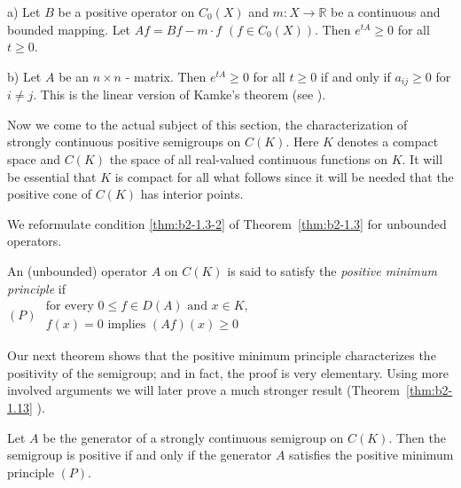 \begin{example}\label{ex:b2-1.4}
a) Let $B$ be a positive operator on $C_{0}(X)$ and $m \colon X \to \mathbb{R}$ be a continuous and bounded mapping.
Let $Af = Bf - m \cdot f$ $(f \in C_{0}(X))$.
Then $e^{tA} \geq 0$ for all $t \geq 0$.

b) Let $A$ be an $n \times n$ - matrix.
Then $e^{tA} \geq 0$ for all $t \geq 0$ if and only if $a_{ij} \geq 0$ for $i \neq j$.
This is the linear version of Kamke's theorem (see \citet{kamke:1932}).
\end{example}

Now we come to the actual subject of this section, the characterization of strongly continuous positive semigroups on $C(K)$.
Here $K$
denotes a compact space and $C(K)$ the space of all real-valued continuous functions on $K$.
It will be essential that $K$ is compact for all what follows since it will be needed that the positive cone of $C(K)$ has interior points.

We reformulate condition \ref{thm:b2-1.3-2} of Theorem~\ref{thm:b2-1.3} for unbounded operators.

\begin{definition}\label{def:b2-1.5}
An (unbounded) operator $A$ on $C(K)$ is said to satisfy the \emph{positive minimum principle} if
\\
$(P)$ \qquad $
\begin{array}
{l}\text{for every } 0 \leq f \in D(A) \text{ and } x \in K,\\
f(x) = 0 \text{ implies } (Af)(x) \geq 0
\end{array}$
\end{definition}

Our next theorem shows that the positive minimum principle characterizes the positivity of the semigroup; and in fact, the proof is very elementary.
Using more involved arguments we will later prove a much stronger result (Theorem~\ref{thm:b2-1.13} ).

\begin{theorem}\label{thm:b2-1.6}
Let $A$ be the generator of a strongly continuous semigroup on $C(K)$.
Then the semigroup is positive if and only if the generator $A$ satisfies the positive minimum principle $(P)$.
\end{theorem}


